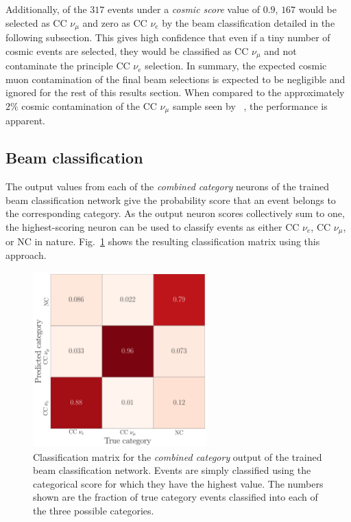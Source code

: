 Additionally, of the $317$ events under a \emph{cosmic score} value of $0.9$, $167$ would be
selected as CC $\nu_{\mu}$ and zero as CC $\nu_{e}$ by the beam classification detailed in the
following subsection. This gives high confidence that even if a tiny number of cosmic events are
selected, they would be classified as CC $\nu_{\mu}$ and not contaminate the principle CC
$\nu_{e}$ selection. In summary, the expected cosmic muon contamination of the final beam
selections is expected to be negligible and ignored for the rest of this results section. When
compared to the approximately $2\%$ cosmic contamination of the CC $\nu_{\mu}$ sample seen by
\nova~\cite{acero2019}, the performance is apparent.

\subsection{Beam classification} %
\label{sec:results_eval_beam} %

The output values from each of the \emph{combined category} neurons of the trained beam
classification network give the probability score that an event belongs to the corresponding
category. As the output neuron scores collectively sum to one, the highest-scoring neuron can be
used to classify events as either CC $\nu_{e}$, CC $\nu_{\mu}$, or NC in nature.
Fig.~\ref{fig:final_comb_cat_confusion} shows the resulting classification matrix using this
approach.

\begin{figure} %
    \includegraphics[width=0.6\textwidth]{diagrams/7-results/final_comb_cat_confusion.pdf}
    \caption[Classification matrix for the combined category output of the beam classification
        network] {Classification matrix for the \emph{combined category} output of the trained
        beam classification network. Events are simply classified using the categorical score for
        which they have the highest value. The numbers shown are the fraction of true category
        events classified into each of the three possible categories.}
    \label{fig:final_comb_cat_confusion}
\end{figure}

